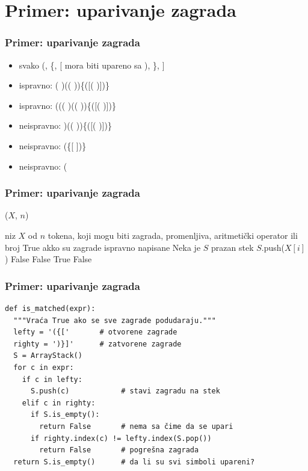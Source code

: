 \documentclass[compress,aspectratio=169]{beamer}
\begin{document}
\section[P: Zagrade]{Primer: uparivanje zagrada}
\begin{frame}[fragile]
  \frametitle{Primer: uparivanje zagrada}
  \begin{itemize}
    \item svako (, \{, [ mora biti upareno sa ), \}, ]
    \item ispravno: ( )(( ))\{([( )])\}
    \item ispravno: ((( )(( ))\{([( )])\}
    \item neispravno: )(( ))\{([( )])\}
    \item neispravno: (\{[ ])\}
    \item neispravno: (
  \end{itemize}
\end{frame}

\begin{frame}[fragile,shrink=10]
  \frametitle{Primer: uparivanje zagrada}
($X$, $n$)
\begin{algorithmic}
\REQUIRE niz $X$ od $n$ tokena, koji mogu biti zagrada, promenljiva, aritmetički operator ili broj
\ENSURE True akko su zagrade ispravno napisane
\STATE Neka je $S$ prazan stek
    \STATE $S$.push($X[i]$)
      \RETURN False 
    \ENDIF
      \RETURN False 
    \ENDIF
  \ENDIF
\ENDFOR
{}
  \RETURN True 
\ELSE
  \RETURN False 
\ENDIF
\end{algorithmic}
\end{frame}

\begin{frame}[fragile,shrink=10]
  \frametitle{Primer: uparivanje zagrada}
\begin{verbatim}
def is_matched(expr):
  """Vraća True ako se sve zagrade podudaraju."""
  lefty = '({['       # otvorene zagrade
  righty = ')}]'      # zatvorene zagrade
  S = ArrayStack()
  for c in expr:
    if c in lefty:
      S.push(c)            # stavi zagradu na stek
    elif c in righty:
      if S.is_empty():
        return False       # nema sa čime da se upari
      if righty.index(c) != lefty.index(S.pop())
        return False       # pogrešna zagrada
  return S.is_empty()      # da li su svi simboli upareni?
\end{verbatim}
\end{frame}
\end{document}
